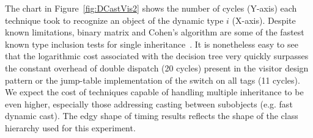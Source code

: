 The chart in Figure~\ref{fig:DCastVis2} shows the number of cycles (Y-axis) each 
technique took to recognize an object of the dynamic type $i$ (X-axis). 
Despite known limitations, binary matrix and Cohen's algorithm are some of the 
fastest known type inclusion tests for single inheritance~\cite{Vitek97}. It 
is nonetheless easy to see that the logarithmic cost associated with the 
decision tree very quickly surpasses the constant overhead of double dispatch 
(20 cycles) present in the visitor design pattern or the jump-table 
implementation of the switch on all tags (11 cycles). We expect the cost of 
techniques capable of handling multiple inheritance to be even higher, especially 
those addressing casting between subobjects (e.g. fast dynamic cast). The edgy 
shape of timing results reflects the shape of the class hierarchy used for this 
experiment.
